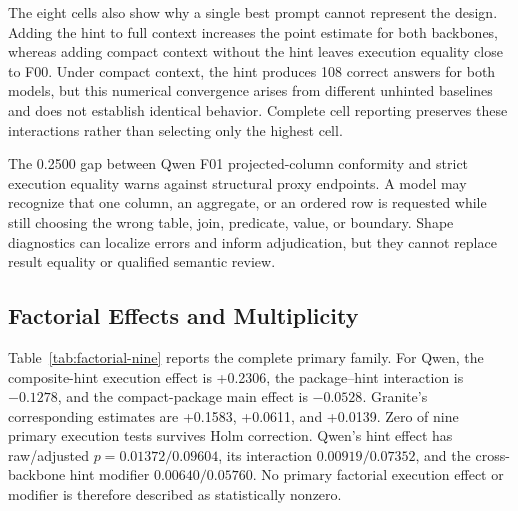 \documentclass[applsci,article,submit,moreauthors]{Definitions/mdpi}
\begin{document}
The eight cells also show why a single best prompt cannot represent the design. Adding the hint to full context increases the point estimate for both backbones, whereas adding compact context without the hint leaves execution equality close to F00. Under compact context, the hint produces 108 correct answers for both models, but this numerical convergence arises from different unhinted baselines and does not establish identical behavior. Complete cell reporting preserves these interactions rather than selecting only the highest cell.

The 0.2500 gap between Qwen F01 projected-column conformity and strict execution equality warns against structural proxy endpoints. A model may recognize that one column, an aggregate, or an ordered row is requested while still choosing the wrong table, join, predicate, value, or boundary. Shape diagnostics can localize errors and inform adjudication, but they cannot replace result equality or qualified semantic review.

\subsection{Factorial Effects and Multiplicity}

Table~\ref{tab:factorial-nine} reports the complete primary family. For Qwen, the composite-hint execution effect is +0.2306, the package--hint interaction is $-0.1278$, and the compact-package main effect is $-0.0528$. Granite's corresponding estimates are +0.1583, +0.0611, and +0.0139. Zero of nine primary execution tests survives Holm correction. Qwen's hint effect has raw/adjusted $p=0.01372/0.09604$, its interaction $0.00919/0.07352$, and the cross-backbone hint modifier $0.00640/0.05760$. No primary factorial execution effect or modifier is therefore described as statistically nonzero.
\end{document}
